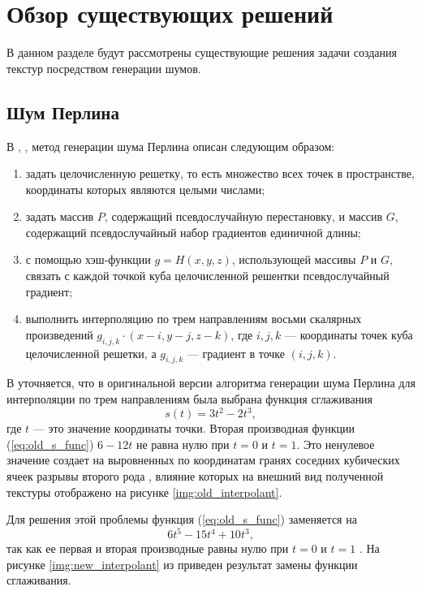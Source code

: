 \chapter{Обзор существующих решений}

В данном разделе будут рассмотрены существующие решения задачи создания текстур посредством генерации шумов.

\section{Шум Перлина}

В \cite{tandm}, \cite{perlin}, \cite{impperlin} метод генерации шума Перлина описан следующим образом:
\begin{enumerate}
	\item задать целочисленную решетку, то есть множество всех точек в пространстве, координаты которых являются целыми числами;
	\item задать массив $P$, содержащий псевдослучайную перестановку, и массив $G$, содержащий псевдослучайный набор градиентов единичной длины;
	\item с помощью хэш-функции $g = H(x, y, z)$, использующей массивы $P$ и $G$, связать с каждой точкой куба целочисленной решентки псевдослучайный градиент;
	\item выполнить интерполяцию по трем направлениям восьми скалярных произведений $g_{i, j, k} \cdot (x - i, y - j, z - k)$, где $i, j, k$  --- координаты точек куба целочисленной решетки, а $g_{i, j, k}$ --- градиент в точке $(i, j, k)$.
\end{enumerate}

В \cite{impperlin} уточняется, что в оригинальной версии алгоритма генерации шума Перлина для интерполяции по трем направлениям была выбрана функция сглаживания
\begin{equation}
	\label{eq:old_s_func}
	s(t) = 3t^2 - 2t^3,
\end{equation}
где $t$ --- это значение координаты точки. Вторая производная функции (\ref{eq:old_s_func}) $6 - 12t$ не равна нулю при $t = 0$ и $t = 1$. 
Это ненулевое значение создает на выровненных по координатам гранях соседних кубических ячеек разрывы второго рода  \cite{impperlin}, влияние которых на внешний вид полученной текстуры отображено на рисунке \ref{img:old_interpolant}.

Для решения этой проблемы функция (\ref{eq:old_s_func}) заменяется на
\begin{equation}
	\label{eq:new_s_func}
	6t^5 - 15t^4 + 10t^3,
\end{equation}
так как ее первая и вторая производные равны нулю при $t = 0$ и $t = 1$ \cite{impperlin}. 
На рисунке \ref{img:new_interpolant} из \cite{impperlin} приведен результат замены функции сглаживания.

